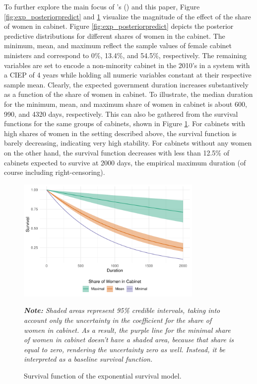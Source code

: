 \documentclass[11pt]{article}
\newcommand\possecite[1]{\citeauthor{#1}'s (\citeyear{#1})}
\newcommand\fnote[1]{\captionsetup{font=footnotesize}\caption*{\textit{#1}}}
\newcommand\minp[1]{\begin{minipage}{0.8\textwidth} #1 \end{minipage}}
\begin{document}
To further explore the main focus of \possecite{KK20} and this paper, Figure \ref{fig:exp_posteriorpredict} and \ref{fig:exp_survplot} visualize the magnitude of the effect of the share of women in cabinet. Figure \ref{fig:exp_posteriorpredict} depicts the posterior predictive distributions for different shares of women in the cabinet. The minimum, mean, and maximum reflect the sample values of female cabinet ministers and correspond to 0\%, 13.4\%, and 54.5\%, respectively. The remaining variables are set to encode a non-minority cabinet in the 2010's in a system with a CIEP of 4 years while holding all numeric variables constant at their respective sample mean. Clearly, the expected government duration increases substantively as a function of the share of women in cabinet. To illustrate, the median duration for the minimum, mean, and maximum share of women in cabinet is about 600, 990, and 4320 days, respectively. This can also be gathered from the survival functions for the same groups of cabinets, shown in Figure \ref{fig:exp_survplot}. For cabinets with high shares of women in the setting described above, the survival function is barely decreasing, indicating very high stability. For cabinets without any women on the other hand, the survival function decreases with less than 12.5\% of cabinets expected to survive at 2000 days, the empirical maximum duration (of course including right-censoring). 

\begin{figure}[!ht]
    \centering
    \minp{\caption{Survival function of the exponential survival model.} \label{fig:exp_survplot}}
    \includegraphics[width = 0.8\textwidth]{figures/fig4_exp_survplot.pdf}
    \minp{\fnote{\textbf{Note:} Shaded areas represent 95\% credible intervals, taking into account only the uncertainty in the coefficient for the share of women in cabinet. As a result, the purple line for the minimal share of women in cabinet doesn't have a shaded area, because that share is equal to zero, rendering the uncertainty zero as well. Instead, it be interpreted as a baseline survival function.}}
\end{figure}
\end{document}
